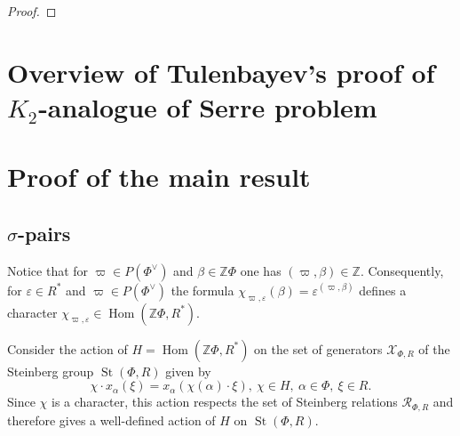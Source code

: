 \documentclass[oneside, 10pt]{amsart}
\DeclareMathOperator{\St}{St}
\DeclareMathOperator{\Hom}{Hom}
\newcommand{\ZZ}{\mathbb{Z}}
\numberwithin{equation}{section}
\numberwithin{lemma}{section}
\theoremstyle{definition}
\theoremstyle{remark}
\begin{document}
\begin{proof}
\begin{comment}
 = {}^{S_{-\beta}(t^d)}\![x_{\alpha+\beta}(b't^{m+1-d}), S_\gamma(at^d)] & \text{ by~\eqref{eq:verify-bmp1'}} \\
 = [S_{\alpha}(b't^{m+1}) x_{\alpha+\beta}(b't^{m+1-d}), S_\gamma(at^d)] & \text{ by~\eqref{eq:verify-bmp1'} and $(b_d)$ if $d\leq m$ or Case~\eqref{case:2} if $d=m+1$ }\\
 = {}^{S_{\alpha}(b't^{m+1})}\!S_{\alpha+\beta+\gamma}(abt^{m+1}) [S_{\alpha}(b't^{m+1}), S_\gamma(at^d)] & \text{ by~\eqref{eq:H1ii} and~\eqref{eq:verify-bmp1'}} \\
 = S_{\alpha+\beta+\gamma}(abt^{m+1}) [S_{\alpha}(b't^{m+1}), S_\gamma(at^d)] & \text{ by Case~\eqref{case:3a},}
\end{align*}
from which the required identity follows. \qedhere
\end{enumerate}
\end{enumerate}
\end{comment}
\end{proof}


\section{Overview of Tulenbayev's proof of $K_2$-analogue of Serre problem}

\section{Proof of the main result}

\subsection{$\sigma$-pairs}
Notice that for $\varpi \in P(\Phi^\vee)$ and $\beta \in \ZZ \Phi$ one has $(\varpi, \beta) \in \ZZ $.
Consequently, for $\varepsilon \in R^*$ and $\varpi \in P(\Phi^\vee)$ the formula $\chi_{\varpi, \varepsilon}(\beta) = \varepsilon ^ {(\varpi, \beta)}$
defines a character $\chi_{\varpi, \varepsilon} \in \Hom(\ZZ \Phi, R^*)$.

Consider the action of $H=\Hom(\ZZ \Phi, R^*)$ on the set of generators $\mathcal{X}_{\Phi, R}$ of the Steinberg group $\St(\Phi, R)$ given by
\begin{equation} \chi \cdot x_\alpha(\xi) = x_\alpha(\chi(\alpha) \cdot \xi),\ \chi \in H,\ \alpha\in \Phi,\ \xi \in R. \end{equation}
Since $\chi$ is a character, this action respects the set of Steinberg relations $\mathcal{R}_{\Phi, R}$ and therefore gives a well-defined action of $H$ on $\St(\Phi, R)$.
\end{document}
